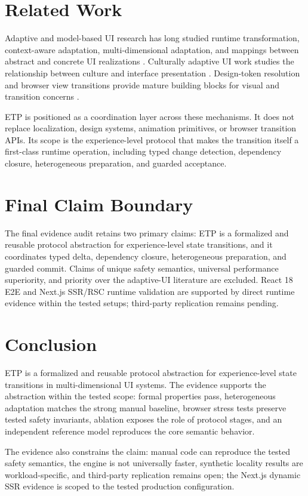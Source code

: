 \documentclass[manuscript,anonymous]{acmart}
\begin{document}
\section{Related Work}
Adaptive and model-based UI research has long studied runtime transformation, context-aware
adaptation, multi-dimensional adaptation, and mappings between abstract and concrete UI
realizations \cite{nilsson2006,calvary2003}. Culturally adaptive UI work studies the
relationship between culture and interface presentation \cite{reinecke2011}. Design-token resolution and browser view transitions provide mature
building blocks for visual and transition concerns \cite{dtcgresolver,w3cvt}.

ETP is positioned as a coordination layer across these mechanisms. It does not replace
localization, design systems, animation primitives, or browser transition APIs. Its scope
is the experience-level protocol that makes the transition itself a first-class runtime
operation, including typed change detection, dependency closure, heterogeneous preparation,
and guarded acceptance.

\section{Final Claim Boundary}
The final evidence audit retains two primary claims: ETP is a formalized and reusable
protocol abstraction for experience-level state transitions, and it coordinates typed
delta, dependency closure, heterogeneous preparation, and guarded commit. Claims of
unique safety semantics, universal performance superiority, and priority over the
adaptive-UI literature are excluded. React 18 E2E and Next.js SSR/RSC runtime validation
are supported by direct runtime evidence within the tested setups; third-party replication
remains pending.

\section{Conclusion}
ETP is a formalized and reusable protocol abstraction for experience-level state transitions
in multi-dimensional UI systems. The evidence supports the abstraction within the tested
scope: formal properties pass, heterogeneous adaptation matches the strong manual baseline,
browser stress tests preserve tested safety invariants, ablation exposes the role of
protocol stages, and an independent reference model reproduces the core semantic behavior.

The evidence also constrains the claim: manual code can reproduce the tested safety semantics,
the engine is not universally faster, synthetic locality results are workload-specific, and
third-party replication remains open; the Next.js dynamic SSR evidence is scoped to the tested production configuration.
\end{document}

